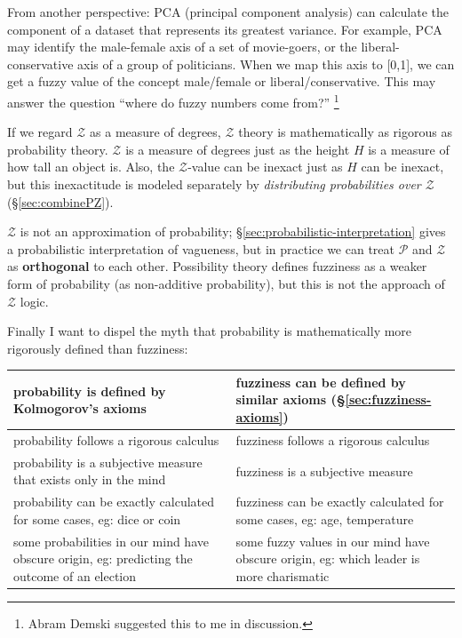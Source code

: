 From another perspective:  PCA (principal component analysis) can calculate the component of a dataset that represents its greatest variance.  For example, PCA may identify the male-female axis of a set of movie-goers, or the liberal-conservative axis of a group of politicians.  When we map this axis to [0,1], we can get a fuzzy value of the concept male/female or liberal/conservative.  This may answer the question ``where do fuzzy numbers come from?'' \footnote{Abram Demski suggested this to me in discussion.}

If we regard $\mathcal{Z}$ as a measure of degrees, $\mathcal{Z}$ theory is mathematically as rigorous as probability theory.  $\mathcal{Z}$ is a measure of degrees just as the height $H$ is a measure of how tall an object is.  Also, the $\mathcal{Z}$-value can be inexact just as $H$ can be inexact, but this inexactitude is modeled separately by \textit{distributing probabilities over $\mathcal{Z}$} (\S\ref{sec:combinePZ}).

$\mathcal{Z}$ is not an approximation of probability; \S\ref{sec:probabilistic-interpretation} gives a probabilistic interpretation of vagueness, but in practice we can treat $\mathcal{P}$ and $\mathcal{Z}$ as \textbf{orthogonal} to each other.  Possibility theory defines fuzziness as a weaker form of probability (as non-additive probability), but this is not the approach of $\mathcal{Z}$ logic.

Finally I want to dispel the myth that probability is mathematically more rigorously defined than fuzziness:

\begin{tabular}{|p{7.5cm}|p{7.5cm}|} \hline
probability is defined by Kolmogorov's axioms &
fuzziness can be defined by similar axioms (\S\ref{sec:fuzziness-axioms})\\
\hline
probability follows a rigorous calculus &
fuzziness follows a rigorous calculus\\
\hline
probability is a subjective measure that exists only in the mind &
fuzziness is a subjective measure\\
\hline
probability can be exactly calculated for some cases, eg: dice or coin &
fuzziness can be exactly calculated for some cases, eg: age, temperature\\
\hline
some probabilities in our mind have obscure origin, eg: predicting the outcome of an election &
some fuzzy values in our mind have obscure origin, eg: which leader is more charismatic\\
\hline
\end{tabular}

